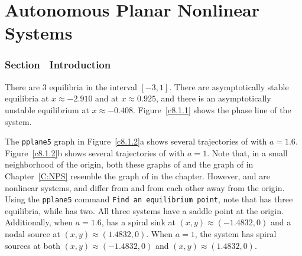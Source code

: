 \chapter{Autonomous Planar Nonlinear Systems}

\subsection*{Section~\protect{\ref{S:introAPNS}} Introduction}

There are 3 equilibria in the interval $[-3,1]$.  There are
asymptotically stable equilibria at $x\approx -2.910$ and at 
$x\approx 0.925$, and there is an asymptotically unstable equilibrium at
$x \approx -0.408$.  Figure~\ref{c8.1.1} shows the phase line
of the system.

\begin{figure}[htb]
                       \centerline{%
                       }
\end{figure}

The {\tt pplane5} graph in Figure~\ref{c8.1.2}a shows several trajectories
 of  with $a = 1.6$.  Figure~\ref{c8.1.2}b shows
several trajectories of  with $a = 1$.  Note that, in
a small neighborhood of the origin, both these graphs of
 and the graph of  in
Chapter~\ref{C:NPS} resemble the graph of  in the
chapter.  However,  and  are
nonlinear systems, and differ from  and from each other
away from the origin.  Using the {\tt pplane5} command
{\tt Find an equilibrium point}, note that  has
three equilibria, while  has two.  All three systems
have a saddle point at the origin.  Additionally, when $a = 1.6$,
 has a spiral sink at $(x,y) \approx (-1.4832,0)$
and a nodal source at $(x,y) \approx (1.4832,0)$.  When $a = 1$, the
system has spiral sources at both $(x,y) \approx (-1.4832,0)$ and
$(x,y) \approx (1.4832,0)$.

\begin{figure}[htb]
                       \centerline{%
                       }
\end{figure}

